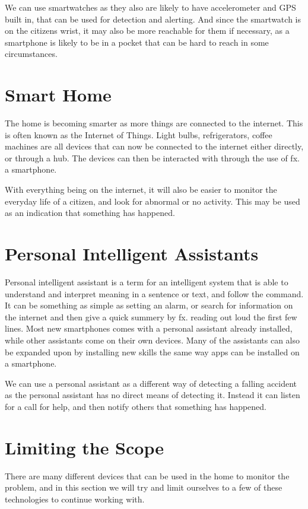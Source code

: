 We can use smartwatches as they also are likely to have accelerometer and GPS built in, that can be used for detection and alerting. And since the smartwatch is on the citizens wrist, it may also be more reachable for them if necessary, as a smartphone is likely to be in a pocket that can be hard to reach in some circumstances.

\section*{Smart Home}
The home is becoming smarter as more things are connected to the internet. This is often known as the Internet of Things. Light bulbs, refrigerators, coffee machines are all devices that can now be connected to the internet either directly, or through a hub. The devices can then be interacted with through the use of fx. a smartphone.

With everything being on the internet, it will also be easier to monitor the everyday life of a citizen, and look for abnormal or no activity. This may be used as an indication that something has happened.

\section*{Personal Intelligent Assistants}
Personal intelligent assistant is a term for an intelligent system that is able to understand and interpret meaning in a sentence or text, and follow the command. It can be something as simple as setting an alarm, or search for information on the internet and then give a quick summery by fx. reading out loud the first few lines. Most new smartphones comes with a personal assistant already installed, while other assistants come on their own devices. Many of the assistants can also be expanded upon by installing new skills the same way apps can be installed on a smartphone.

We can use a personal assistant as a different way of detecting a falling accident as the personal assistant has no direct means of detecting it. Instead it can listen for a call for help, and then notify others that something has happened.

\section*{Limiting the Scope}
There are many different devices that can be used in the home to monitor the problem, and in this section we will try and limit ourselves to a few of these technologies to continue working with.

